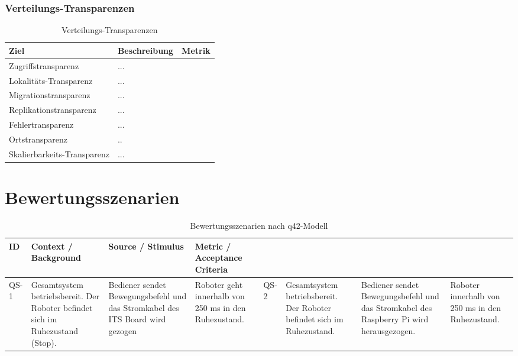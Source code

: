 \newpage
\subsubsection{Verteilungs-Transparenzen}
\begin{table}[h!]
	\centering
	\begin{tabular}{p{4cm}|p{5cm}|p{5cm}|}
		\hline
		\textbf{Ziel} & \textbf{Beschreibung} & \textbf{Metrik} \\
		\hline
		Zugriffstransparenz   & ...&\\
		\hline
		Lokalitäts-Transparenz  & ...&\\
		\hline
		Migrationstransparenz & ...&\\
		\hline
		Replikationstransparenz &...&\\
		\hline
		Fehlertransparenz &... &\\
		\hline
		Ortstransparenz & .. &\\
		\hline
		Skalierbarkeits-Transparenz & ... & \\
		\hline
	\end{tabular}
	\caption{Verteilungs-Transparenzen}
	\label{tab:transparenzen}
\end{table}

\newpage

\section{Bewertungsszenarien}
\begin{table}[h!]
\centering
\begin{tabular}{p{2cm}|p{5cm}|p{4cm}|p{5cm}}
\hline
\textbf{ID} & \textbf{Context / Background} & \textbf{Source / Stimulus} & \textbf{Metric / Acceptance Criteria} \\
\hline
QS-1 &
Gesamtsystem betriebsbereit. Der Roboter befindet sich im Ruhezustand (Stop). &
Bediener sendet Bewegungsbefehl und das Stromkabel des ITS Board wird gezogen & 
Roboter geht innerhalb von 250 ms in den Ruhezustand. &

\hline
QS-2 &
Gesamtsystem betriebsbereit. Der Roboter befindet sich im Ruhezustand. &
Bediener sendet Bewegungsbefehl und das Stromkabel des Raspberry Pi wird herausgezogen. &
Roboter innerhalb von 250 ms in den Ruhezustand. 

\end{tabular}
\caption{Bewertungsszenarien nach q42-Modell}
\label{tab:bewertungsszenarien}
\end{table}
